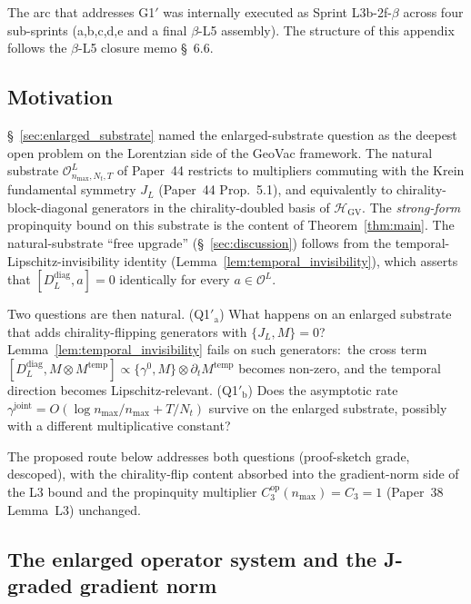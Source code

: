 \documentclass[11pt,a4paper]{article}
\theoremstyle{plain}
\theoremstyle{definition}
\newcommand{\nmax}{n_{\max}}
\newcommand{\Nt}{N_{t}}
\newcommand{\Op}{\mathcal{O}}
\newcommand{\Ddiag}{D_{L}^{\mathrm{diag}}}
\newcommand{\JL}{J_{L}}
\newcommand{\gammajoint}{\gamma^{\mathrm{joint}}}
\newcommand{\Cthreeop}{C_{3}^{\mathrm{op}}}
\newcommand{\HGV}{\mathcal{H}_{\mathrm{GV}}}
\newcommand{\temp}{\mathrm{temp}}
\begin{document}
The arc that addresses G1$'$ was internally executed as Sprint
L3b-2f-$\beta$ across four sub-sprints (a,b,c,d,e and a final
$\beta$-L5 assembly). The structure of this appendix follows the
$\beta$-L5 closure memo \S~6.6.

\subsection{Motivation}\label{app:enlarged_motivation}

\S~\ref{sec:enlarged_substrate} named the enlarged-substrate question
as the deepest open problem on the Lorentzian side of the GeoVac
framework. The natural substrate $\Op^{L}_{\nmax, \Nt, T}$ of Paper~44
restricts to multipliers commuting with the Krein fundamental symmetry
$\JL$ (Paper~44 Prop.~5.1), and equivalently to chirality-block-diagonal
generators in the chirality-doubled basis of $\HGV$. The
\emph{strong-form} propinquity bound on this substrate is the content
of Theorem~\ref{thm:main}. The natural-substrate ``free upgrade''
(\S~\ref{sec:discussion}) follows from the temporal-Lipschitz-invisibility
identity (Lemma~\ref{lem:temporal_invisibility}), which asserts that
$[\Ddiag, a] = 0$ identically for every $a \in \Op^{L}$.

Two questions are then natural. (Q1$'_{\mathrm{a}}$)
What happens on an enlarged substrate that adds chirality-flipping
generators with $\{\JL, M\} = 0$? Lemma~\ref{lem:temporal_invisibility}
fails on such generators:\ the cross term $[\Ddiag, M \otimes M^{\temp}]
\propto \{\gamma^{0}, M\} \otimes \partial_{t} M^{\temp}$ becomes
non-zero, and the temporal direction becomes Lipschitz-relevant.
(Q1$'_{\mathrm{b}}$) Does the asymptotic rate
$\gammajoint = O(\log\nmax/\nmax + T/\Nt)$ survive on the enlarged
substrate, possibly with a different multiplicative constant?

The proposed route below addresses both questions (proof-sketch grade, descoped), with the
chirality-flip content absorbed into the gradient-norm side of the
L3 bound and the propinquity multiplier $\Cthreeop(\nmax) = C_{3} = 1$
(Paper~38~\cite{paper38} Lemma~L3) unchanged.

\subsection{The enlarged operator system and the J-graded gradient norm}
\label{app:enlarged_substrate_def}
\end{document}
